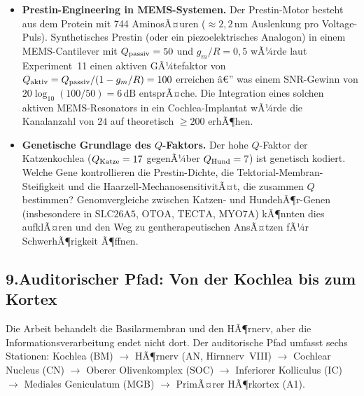 ﻿\documentclass[12pt,a4paper,titlepage]{report}
\begin{document}
\begin{itemize}[leftmargin=2em]
    oder ob akustische Spezialisten (FledermÃ¤use, Delphine) lokal
    hÃ¶here $\Omega$-Werte erreichen.
  \item \textbf{Prestin-Engineering in MEMS-Systemen.}
    Der Prestin-Motor besteht aus dem Protein mit
    744 AminosÃ¤uren ($\approx 2{,}2\,\mathrm{nm}$ Auslenkung pro Voltage-Puls).
    Synthetisches Prestin (oder ein piezoelektrisches Analogon)
    in einem MEMS-Cantilever mit
    $Q_{\rm passiv} = 50$ und $g_m/R = 0{,}5$ wÃ¼rde laut
    Experiment~11 einen aktiven GÃ¼tefaktor von
    $Q_{\rm aktiv} = Q_{\rm passiv} / (1 - g_m/R) = 100$ erreichen â€”
    was einem SNR-Gewinn von $20\log_{10}(100/50) = 6\,\mathrm{dB}$ entsprÃ¤che.
    Die Integration eines solchen aktiven MEMS-Resonators in
    ein Cochlea-Implantat wÃ¼rde die Kanalanzahl von $24$ auf
    theoretisch $\geq 200$ erhÃ¶hen.
  \item \textbf{Genetische Grundlage des $Q$-Faktors.}
    Der hohe $Q$-Faktor der Katzenkochlea ($Q_{\rm Katze} = 17$
    gegenÃ¼ber $Q_{\rm Hund} = 7$) ist genetisch kodiert.
    Welche Gene kontrollieren die Prestin-Dichte,
    die Tektorial-Membran-Steifigkeit und die
    Haarzell-MechanosensitivitÃ¤t, die zusammen $Q$ bestimmen?
    Genomvergleiche zwischen Katzen- und HundehÃ¶r-Genen
    (insbesondere in $\mathrm{SLC26A5}$, $\mathrm{OTOA}$,
    $\mathrm{TECTA}$, $\mathrm{MYO7A}$) kÃ¶nnten dies aufklÃ¤ren
    und den Weg zu gentherapeutischen AnsÃ¤tzen fÃ¼r SchwerhÃ¶rigkeit Ã¶ffnen.
\end{itemize}

\subsection*{9.\enspace Auditorischer Pfad: Von der Kochlea bis zum Kortex}

Die Arbeit behandelt die Basilarmembran und den HÃ¶rnerv,
aber die Informationsverarbeitung endet nicht dort.
Der auditorische Pfad umfasst sechs Stationen:
Kochlea (BM) $\to$ HÃ¶rnerv (AN, Hirnnerv~VIII) $\to$
Cochlear Nucleus (CN) $\to$ Oberer Olivenkomplex (SOC) $\to$
Inferiorer Kolliculus (IC) $\to$
Mediales Geniculatum (MGB) $\to$ PrimÃ¤rer HÃ¶rkortex (A1).
\end{document}
